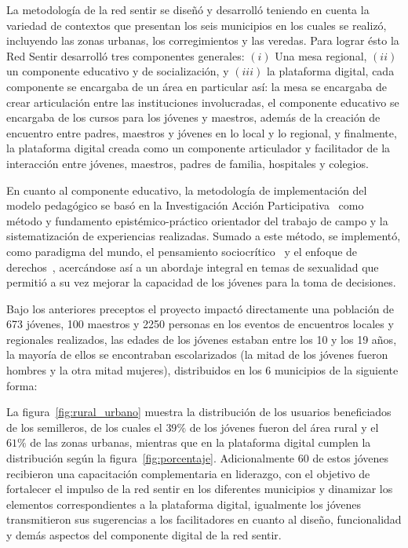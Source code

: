 \documentclass[journal,transmag]{IEEEtran}
\begin{document}
La metodología de la red sentir se diseñó y desarrolló teniendo en cuenta la variedad de contextos que presentan los seis municipios en los cuales se realizó, incluyendo las zonas urbanas, los corregimientos y las veredas. Para lograr ésto la Red Sentir desarrolló tres componentes generales: $(i)$ Una mesa regional, $(ii)$ un componente educativo y de socialización, y $(iii)$ la plataforma digital, cada componente se encargaba de un área en particular así: la mesa se encargaba de crear articulación entre las instituciones  involucradas, el componente educativo se encargaba de los cursos para los jóvenes y maestros, además de la creación de encuentro entre padres, maestros y jóvenes en lo local y lo regional, y finalmente, la plataforma digital creada como un componente articulador y facilitador de la interacción entre jóvenes, maestros, padres de familia, hospitales y colegios.

En cuanto al componente educativo, la metodología de implementación del modelo pedagógico se basó en la Investigación Acción Participativa~\cite{fals2008socialismo} como método y fundamento epistémico-práctico orientador del trabajo de campo y la sistematización de experiencias realizadas. Sumado a este método, se implementó, como paradigma del mundo, el pensamiento sociocrítico~\cite{stanley1991postmodern} y el enfoque de derechos~\cite{unesco}, acercándose así a un abordaje integral en temas de sexualidad que permitió a su vez mejorar la capacidad de los jóvenes para la toma de decisiones.

Bajo los anteriores preceptos el proyecto impactó directamente una población de 673 jóvenes, 100 maestros y 2250 personas en los eventos de encuentros locales y regionales realizados, las edades de los jóvenes estaban entre los 10 y los 19 años, la mayoría de ellos se encontraban escolarizados (la mitad de los jóvenes fueron hombres y la otra mitad mujeres), distribuidos en los 6 municipios de la siguiente forma: 

La figura~\ref{fig:rural_urbano} muestra la distribución de los usuarios beneficiados de los semilleros, de los cuales el $39\%$ de los jóvenes fueron del área rural y el $61\%$ de las zonas urbanas, mientras que en la plataforma digital cumplen la distribución según la figura~\ref{fig:porcentaje}. Adicionalmente 60 de estos jóvenes recibieron una capacitación complementaria en liderazgo, con el objetivo de fortalecer el impulso de la red sentir en los diferentes municipios y dinamizar los elementos correspondientes a la plataforma digital, igualmente los jóvenes transmitieron sus sugerencias a los facilitadores en cuanto al diseño, funcionalidad y demás aspectos del componente digital de la red sentir.
\end{document}
